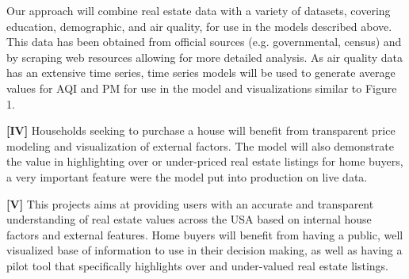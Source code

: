 \documentclass[sigconf,nonacm,11pt]{acmart}
\begin{document}
Our approach will combine real estate data with a variety of datasets, covering education, demographic, and air quality, for use in the models described above. This data has been obtained from official sources (e.g. governmental, census) and by scraping web resources allowing for more detailed analysis. As air quality data has an extensive time series, time series models will be used to generate average values for AQI and PM for use in the model and visualizations similar to Figure 1.


\textbf{[IV]}
Households seeking to purchase a house will benefit from transparent price modeling and visualization of external factors. The model will also demonstrate the value in highlighting over or under-priced real estate listings for home buyers, a very important feature were the model put into production on live data.

\textbf{[V]}
This projects aims at providing users with an accurate and transparent understanding of real estate values across the USA based on internal house factors and external features. Home buyers will benefit from having a public, well visualized base of information to use in their decision making, as well as having a pilot tool that specifically highlights over and under-valued real estate listings.
\end{document}
